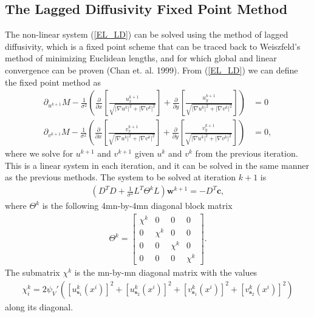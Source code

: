\documentclass[10pt,a4paper]{article}
\begin{document}
\subsection{The Lagged Diffusivity Fixed Point Method}
The non-linear system (\ref{EL_LD}) can be solved using the method of lagged diffusivity, which is a fixed point scheme that can be traced back to Weiszfeld's method of minimizing Euclidean lengths, and for which global and linear convergence can be proven (Chan et. al. 1999). From (\ref{EL_LD}) we can define the fixed point method as
\begin{align*}
\partial_{u^{k+1}} M - \frac{1}{\sigma^2} \left(\frac{\partial}{\partial x}\left[ \frac{u^{k+1}_x}{\sqrt{|\nabla u^k|^2 + |\nabla v^k|^2}} \right] + \frac{\partial}{\partial y} \left[ \frac{u^{k+1}_y}{\sqrt{|\nabla u^k|^2 + |\nabla v^k|^2}} \right] \right) &= 0 \\
\partial_{v^{k+1}} M - \frac{1}{\sigma^2} \left(\frac{\partial}{\partial x}\left[ \frac{v^{k+1}_x}{\sqrt{|\nabla u^k|^2 + |\nabla v^k|^2}} \right] + \frac{\partial}{\partial y} \left[ \frac{v^{k+1}_y}{\sqrt{|\nabla u^k|^2 + |\nabla v^k|^2}} \right] \right) &= 0,
\end{align*}
where we solve for $u^{k+1}$ and $v^{k+1}$ given $u^k$ and $v^k$ from the previous iteration. This is a linear system in each iteration, and it can be solved in the same manner as the previous methods. The system to be solved at iteration $k+1$ is
\begin{align*}
(D^T D + \frac{1}{\sigma^2} L^T\Theta^{k}L) \textbf{w}^{k+1} = - D^T \textbf{c},
\end{align*}
where $\Theta^k$ is the following 4mn-by-4mn diagonal block matrix
\begin{align*}
\Theta^k = \left[
\begin{array}{c|c|c|c}
\chi^k & 0 & 0 & 0 \\ \hline
0 & \chi^k & 0 & 0 \\ \hline
0 & 0 & \chi^k & 0 \\ \hline
0 & 0 & 0 & \chi^k
\end{array}
\right].
\end{align*}
The submatrix $\chi^k$ is the mn-by-mn diagonal matrix with the values 
\begin{align*}
\chi^k_i = 2 \psi_V'\left( \left[u^k_{\textbf{s}_1}(x^i)\right]^2 + \left[u^k_{\textbf{s}_2}(x^i)\right]^2 + \left[v^k_{\textbf{s}_1}(x^i)\right]^2 + \left[v^k_{\textbf{s}_2}(x^i)\right]^2 \right)
\end{align*}
along its diagonal.
  
\end{document}

